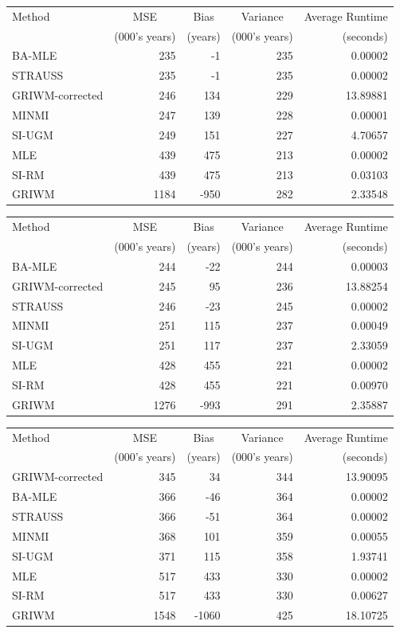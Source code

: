 \documentclass[
]{article}
\begin{document}
\begin{tabular}{lrrrr}
\toprule
\multicolumn{1}{l}{Method} & \multicolumn{1}{c}{MSE} & \multicolumn{1}{c}{Bias} & \multicolumn{1}{c}{Variance} & \multicolumn{1}{c}{Average Runtime} \\
 & (000's years) & (years) & (000's years) & (seconds)\\
\midrule
BA-MLE & 235 & -1 & 235 & 0.00002\\
STRAUSS & 235 & -1 & 235 & 0.00002\\
GRIWM-corrected & 246 & 134 & 229 & 13.89881\\
MINMI & 247 & 139 & 228 & 0.00001\\
SI-UGM & 249 & 151 & 227 & 4.70657\\
\addlinespace
MLE & 439 & 475 & 213 & 0.00002\\
SI-RM & 439 & 475 & 213 & 0.03103\\
GRIWM & 1184 & -950 & 282 & 2.33548\\
\bottomrule
\end{tabular}

\begin{tabular}{lrrrr}
\toprule
\multicolumn{1}{l}{Method} & \multicolumn{1}{c}{MSE} & \multicolumn{1}{c}{Bias} & \multicolumn{1}{c}{Variance} & \multicolumn{1}{c}{Average Runtime} \\
 & (000's years) & (years) & (000's years) & (seconds)\\
\midrule
BA-MLE & 244 & -22 & 244 & 0.00003\\
GRIWM-corrected & 245 & 95 & 236 & 13.88254\\
STRAUSS & 246 & -23 & 245 & 0.00002\\
MINMI & 251 & 115 & 237 & 0.00049\\
SI-UGM & 251 & 117 & 237 & 2.33059\\
\addlinespace
MLE & 428 & 455 & 221 & 0.00002\\
SI-RM & 428 & 455 & 221 & 0.00970\\
GRIWM & 1276 & -993 & 291 & 2.35887\\
\bottomrule
\end{tabular}

\begin{tabular}{lrrrr}
\toprule
\multicolumn{1}{l}{Method} & \multicolumn{1}{c}{MSE} & \multicolumn{1}{c}{Bias} & \multicolumn{1}{c}{Variance} & \multicolumn{1}{c}{Average Runtime} \\
 & (000's years) & (years) & (000's years) & (seconds)\\
\midrule
GRIWM-corrected & 345 & 34 & 344 & 13.90095\\
BA-MLE & 366 & -46 & 364 & 0.00002\\
STRAUSS & 366 & -51 & 364 & 0.00002\\
MINMI & 368 & 101 & 359 & 0.00055\\
SI-UGM & 371 & 115 & 358 & 1.93741\\
\addlinespace
MLE & 517 & 433 & 330 & 0.00002\\
SI-RM & 517 & 433 & 330 & 0.00627\\
GRIWM & 1548 & -1060 & 425 & 18.10725\\
\bottomrule
\end{tabular}
\end{document}
